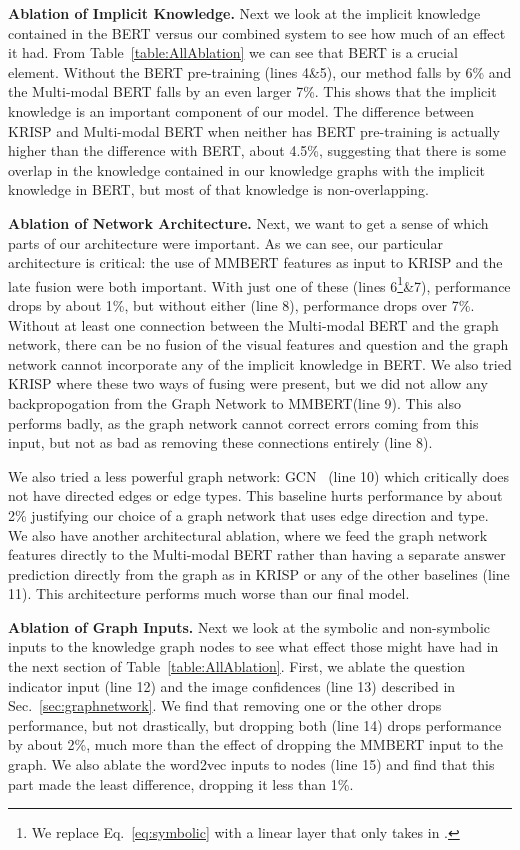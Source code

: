 \documentclass[final]{cvpr}
\providecommand{\ModelName}{KRISP\xspace}
\providecommand{\MMBERTBase}{Multi-modal BERT\xspace}
\providecommand{\MMBERTAbr}{MMBERT\xspace}
\providecommand{\myparagraph}[1]{\noindent\textbf{#1.}}
\begin{document}
\myparagraph{Ablation of Implicit Knowledge}
Next we look at the implicit knowledge contained in the BERT versus our combined system 
to see how much of an effect it had. From Table~\ref{table:AllAblation} we can see that BERT is a crucial element. Without the BERT pre-training (lines 4\&5), our method falls by 6\% and the \MMBERTBase falls by an even larger 7\%. This shows that the implicit knowledge is an important component of our model. The difference between \ModelName and \MMBERTBase when neither has BERT pre-training is actually higher than the difference with BERT, about 4.5\%, suggesting that there is some overlap in the knowledge contained in our knowledge graphs with the implicit knowledge in BERT, but most of that knowledge is non-overlapping.

\myparagraph{Ablation of Network Architecture}
Next, we want to get a sense of which parts of our architecture were important. As we can see, our particular architecture is critical: the use of \MMBERTAbr features as input to \ModelName and the late fusion were both important.
With just one of these (lines 6\footnote{We replace Eq.~\ref{eq:symbolic} with a linear layer that only takes in .}\&7), performance drops by about 1\%, but without either (line 8), performance drops over 7\%. Without at least one connection between the \MMBERTBase and the graph network, there can be no fusion of the visual features and question and the graph network cannot incorporate any of the implicit knowledge in BERT. We also tried \ModelName where these two ways of fusing were present, but we did not allow any backpropogation from the Graph Network to \MMBERTAbr (line 9). This also performs badly, as the graph network cannot correct errors coming from this input, but not as bad as removing these connections entirely (line 8).

We also tried a less powerful graph network: GCN~\cite{kipf2016semi} (line 10) which critically does not have directed edges or edge types. This baseline hurts performance by about 2\% justifying our choice of a graph network that uses edge direction and type. We also have another architectural ablation, where we feed the graph network features directly to the \MMBERTBase rather than having a separate answer prediction directly from the graph as in \ModelName or any of the other baselines (line 11). This architecture performs much worse than our final model.

\myparagraph{Ablation of Graph Inputs}
Next we look at the symbolic and non-symbolic inputs to the knowledge graph nodes to see what effect those might have had in the next section of Table~\ref{table:AllAblation}. First, we ablate the question indicator input (line 12) and the image confidences (line 13) described in Sec.~\ref{sec:graphnetwork}. We find that removing one or the other drops performance, but not drastically, but dropping both (line 14) drops performance by about 2\%, much more than the effect of dropping the \MMBERTAbr input to the graph. We also ablate the word2vec inputs to nodes (line 15) and find that this part made the least difference, dropping it less than 1\%.
\end{document}
